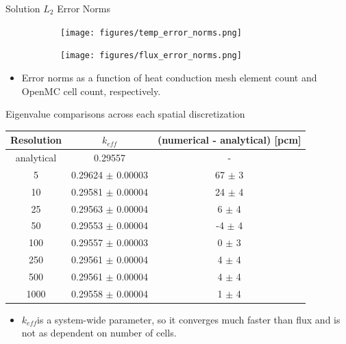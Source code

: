 \documentclass[9pt,t]{beamer}
\newcommand{\keff}{$k_{e\!f\!f}$}
\begin{document}
\begin{frame}{Solution $L_{2}$ Error Norms}
    \begin{figure}[T]
        \hspace*{-0.9cm}
        \begin{subfigure}{0.4995\linewidth}
            \texttt{[image: figures/temp\_error\_norms.png]}
        \end{subfigure}\hspace*{0.85cm}
        \begin{subfigure}{0.4995\linewidth}
            \texttt{[image: figures/flux\_error\_norms.png]}
        \end{subfigure}
    \end{figure}
    \begin{itemize}
        \item Error norms as a function of heat conduction mesh element count and OpenMC cell count, respectively.
    \end{itemize}
\end{frame}

\begin{frame}{Eigenvalue comparisons across each spatial discretization}
    \begin{table}[H]
        \centering
        \begin{tabular}{@{}ccc@{}}
            \toprule
            Resolution &  \keff & (numerical - analytical) [pcm]\\
            \midrule
            analytical & 0.29557 & - \\
            \midrule
            5    & 0.29624 $\pm$ 0.00003 & \phantom{-}67 $\pm$ 3 \\
            10   & 0.29581 $\pm$ 0.00004 & \phantom{-}24 $\pm$ 4 \\
            25   & 0.29563 $\pm$ 0.00004 & \phantom{-}6  $\pm$ 4 \\
            50   & 0.29553 $\pm$ 0.00004 &           -4  $\pm$ 4 \\
            100  & 0.29557 $\pm$ 0.00003 & \phantom{-}0  $\pm$ 3 \\
            250  & 0.29561 $\pm$ 0.00004 & \phantom{-}4  $\pm$ 4 \\
            500  & 0.29561 $\pm$ 0.00004 & \phantom{-}4  $\pm$ 4 \\
            1000 & 0.29558 $\pm$ 0.00004 & \phantom{-}1  $\pm$ 4 \\
        \bottomrule
        \end{tabular}
    \end{table}
    \begin{itemize}
        \item<2-> \keff is a system-wide parameter, so it converges much faster than flux and is not as dependent on number of cells.
    \end{itemize}
\end{frame}
\end{document}
